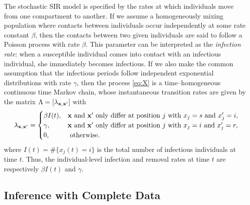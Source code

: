 \documentclass[11pt]{article}
\newcommand{\jx}[1]{{\color{blue}{ #1}}}
\begin{document}
	The stochastic SIR model is specified by the rates at which individuals move from one compartment to another. If we assume a homogeneously mixing population where contacts between individuals occur independently at some rate constant $\beta$, then the contacts between two given individuals are said to follow a Poisson process with rate $\beta$. This parameter can be interpreted as the \textit{infection rate}: when a susceptible individual comes into contact with an infectious individual, she immediately becomes infectious.
	If we also make the common assumption that the infectious periods follow independent exponential distributions with rate $\gamma$, then the process \eqref{eq:X} is a time–homogeneous continuous time Markov chain, whose instantaneous transition rates 
	are given by the matrix $\Lambda = [\lambda_{\mathbf{x}, \mathbf{x}'}]$ with
	$$
	\lambda_{\mathbf{x}, \mathbf{x}'} = 
	\begin{cases}
		\beta I(t), & \mathbf{x} \text{ and } \mathbf{x}' \text{ only differ at position } j \text{ with } x_j = s \text{ and } x_j' = i, \\
		\gamma, & \mathbf{x} \text{ and } \mathbf{x}' \text{ only differ at position } j \text{ with } x_j = i \text{ and } x_j' = r, \\
		0, & \text{ otherwise.}
	\end{cases}
	$$
	where $I(t) = \#\{x_j(t) = i\}$ is the total number of infectious individuals at time $t$. Thus, the individual-level infection and removal rates at time $t$ are respectively $\beta I(t)$ and $\gamma$.
	
	
	\subsection{Inference with Complete Data}
	\label{sec:icd}
	
\end{document}
